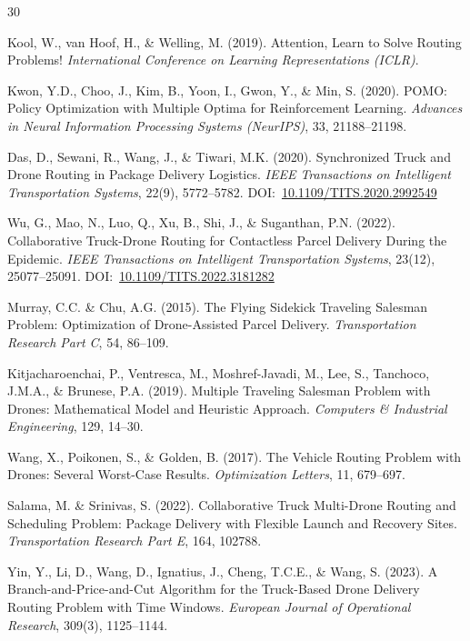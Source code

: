 \documentclass[11pt,a4paper]{article}
\begin{document}
\begin{thebibliography}{30}

 Kool, W., van Hoof, H., \& Welling, M. (2019). Attention, Learn to
Solve Routing Problems! \textit{International Conference on Learning
Representations (ICLR)}.

 Kwon, Y.D., Choo, J., Kim, B., Yoon, I., Gwon, Y., \& Min, S.
(2020). POMO: Policy Optimization with Multiple Optima for Reinforcement Learning.
\textit{Advances in Neural Information Processing Systems (NeurIPS)}, 33,
21188--21198.


 Das, D., Sewani, R., Wang, J., \& Tiwari, M.K. (2020). Synchronized
Truck and Drone Routing in Package Delivery Logistics. \textit{IEEE Transactions on
Intelligent Transportation Systems}, 22(9), 5772--5782.
DOI:~\href{https://doi.org/10.1109/TITS.2020.2992549}{10.1109/TITS.2020.2992549}

 Wu, G., Mao, N., Luo, Q., Xu, B., Shi, J., \& Suganthan, P.N.
(2022). Collaborative Truck-Drone Routing for Contactless Parcel Delivery During
the Epidemic. \textit{IEEE Transactions on Intelligent Transportation Systems},
23(12), 25077--25091.
DOI:~\href{https://doi.org/10.1109/TITS.2022.3181282}{10.1109/TITS.2022.3181282}

 Murray, C.C. \& Chu, A.G. (2015). The Flying Sidekick Traveling
Salesman Problem: Optimization of Drone-Assisted Parcel Delivery.
\textit{Transportation Research Part C}, 54, 86--109.

 Kitjacharoenchai, P., Ventresca, M.,
Moshref-Javadi, M., Lee, S., Tanchoco, J.M.A., \& Brunese, P.A. (2019). Multiple
Traveling Salesman Problem with Drones: Mathematical Model and Heuristic Approach.
\textit{Computers \& Industrial Engineering}, 129, 14--30.

 Wang, X., Poikonen, S., \& Golden, B. (2017). The Vehicle Routing
Problem with Drones: Several Worst-Case Results. \textit{Optimization Letters}, 11,
679--697.

 Salama, M. \& Srinivas, S. (2022). Collaborative Truck
Multi-Drone Routing and Scheduling Problem: Package Delivery with Flexible Launch
and Recovery Sites. \textit{Transportation Research Part E}, 164, 102788.

 Yin, Y., Li, D., Wang, D., Ignatius, J., Cheng, T.C.E., \&
Wang, S. (2023). A Branch-and-Price-and-Cut Algorithm for the Truck-Based Drone
Delivery Routing Problem with Time Windows. \textit{European Journal of Operational
Research}, 309(3), 1125--1144.


\end{thebibliography}
\end{document}
